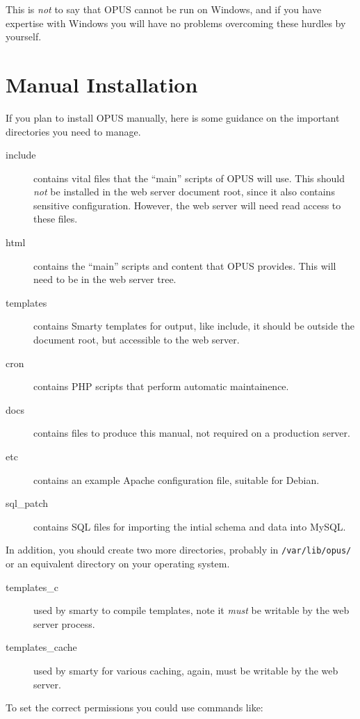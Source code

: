 \documentclass[12 pt]{book}
\begin{document}
This is \emph{not} to say that OPUS cannot be run on Windows, and if you have expertise with Windows you will have no problems overcoming these
hurdles by yourself.

\section{Manual Installation}

If you plan to install OPUS manually, here is some guidance on the important directories you need to manage.

\begin{description}
  \item[include] contains vital files that the ``main'' scripts of OPUS will use. This should \emph{not} be installed in the web server document root, since
  it also contains sensitive configuration. However, the web server will need read access to these files.
  \item[html] contains the ``main'' scripts and content that OPUS provides. This will need to be in the web server tree.
  \item[templates] contains Smarty templates for output, like include, it should be outside the document root, but accessible to the web server.
  \item[cron] contains PHP scripts that perform automatic maintainence. 
  \item[docs] contains files to produce this manual, not required on a production server.
  \item[etc] contains an example Apache configuration file, suitable for Debian.
  \item[sql\_patch] contains SQL files for importing the intial schema and data into MySQL.
\end{description}

In addition, you should create two more directories, probably in \lstinline!/var/lib/opus/! or an
equivalent directory on your operating system. 

\begin{description}
  \item[templates\_c] used by smarty to compile templates, note it \emph{must} be writable by the web server process.
  \item[templates\_cache] used by smarty for various caching, again, must be writable by the web server.
\end{description}

To set the correct permissions you could use commands like:
\end{document}
